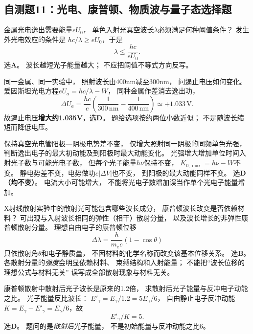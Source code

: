 \subsection{自测题11：光电、康普顿、物质波与量子态选择题}

\problemtext 金属光电逸出需要能量$eU_0$，
单色入射光真空波长$\lambda$必须满足何种阈值条件？
\workings
发生外光电效应的条件是
$hc/\lambda\ge eU_0$，于是
\[
\boxed{\lambda\le\frac{hc}{eU_0}}.
\]
选\textbf{A}。
\crosscheck 波长越短光子能量越大；
不应把阈值不等式方向反写。

\problemtext 同一金属、同一实验中，
照射波长由400nm减至300nm，
问遏止电压如何变化。
\workings
爱因斯坦光电方程$eU_a=hc/\lambda-W$，
同种金属作差消去逸出功，
\[
\Delta U_a=\frac{hc}{e}
\left(\frac1{300\,\mathrm{nm}}-\frac1{400\,\mathrm{nm}}\right)
\simeq\boxed{+1.033\,\mathrm V}.
\]
故遏止电压\textbf{增大约1.035V}，选\textbf{D}。
\crosscheck 题给选项按约两位小数近似；
不是随波长缩短而降低电压。

\problemtext 保持真空光电管阳极—阴极电势差不变，
仅增大照射同一阴极的同频单色光强，
判断逸出电子的最大初动能及到阳极时最大动能变化。
\workings
光强增大增加单位时间入射光子数与可能光电子数，
但每个光子能量$h\nu$保持不变，
$\boxed{K_{0,\max}=h\nu-W}$不变。
静电势差不变，电势做功$e|\Delta V|$也不变，
到阳极的最大动能同样不变。
选\textbf{D（均不变）}。
\crosscheck 电流大小可能增大，
不能将光电子数增加误当作单个光电子能量增加。

\problemtext X射线散射实验中的散射光可能包含哪些波长成分，
康普顿波长改变是否依赖材料？
\workings
可出现与入射波长相同的弹性（相干）散射分量，
以及波长增长的非弹性康普顿散射分量。
理想自由电子的康普顿位移
\[
\boxed{\Delta\lambda=\frac{h}{m_ec}(1-\cos\theta)}
\]
只依散射角$\theta$和电子静质量，
不因材料的化学名称而改变该基本位移关系。
选\textbf{B}。
\crosscheck 各散射分量的\emph{强度}会明显依赖材料、
束缚结构和入射能量；
不能把“波长位移的理想公式与材料无关”
误写成全部散射现象与材料无关。

\problemtext 康普顿散射中散射后光子波长是原来的1.2倍，
求散射后光子能量与反冲电子动能之比。
\workings
光子能量反比波长：
$E'_\gamma=E_\gamma/1.2=5E_\gamma/6$，
自由静止电子反冲动能
$K=E_\gamma-E'_\gamma=E_\gamma/6$，故
\[
\boxed{E'_\gamma/K=5}.
\]
选\textbf{D}。
\crosscheck 题问的是\emph{散射后}光子能量，
不是初始能量与反冲动能之比6。

